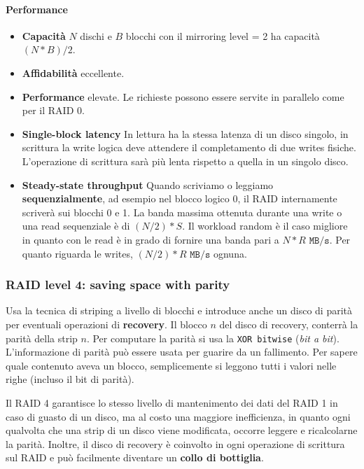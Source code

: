 \documentclass[12pt, letterpaper]{article}
\begin{document}
				\paragraph{Performance}
					\begin{itemize}
						\item \textbf{Capacità} $N$ dischi e $B$ blocchi con il mirroring level = 2 ha capacità $(N*B)/2$.
						\item \textbf{Affidabilità} eccellente.
						\item \textbf{Performance} elevate. Le richieste possono essere servite in parallelo come per il RAID 0.
						\item \textbf{Single-block latency} In lettura ha la stessa latenza di un disco singolo, in scrittura la write logica deve attendere il completamento di due writes fisiche. L'operazione di scrittura sarà più lenta rispetto a quella in un singolo disco.
						\item \textbf{Steady-state throughput} Quando scriviamo o leggiamo \textbf{sequenzialmente}, ad esempio nel blocco logico 0, il RAID internamente scriverà sui blocchi 0 e 1. La banda massima ottenuta durante una write o una read sequenziale è di $(N/2)*S$.  Il workload random è il caso migliore in quanto con le read è in grado di fornire una banda pari a $N*R \texttt{ MB/s}$. Per quanto riguarda le writes, $(N/2)*R \texttt{ MB/s}$ ognuna.
					\end{itemize}
					
			\subsubsection{RAID level 4: saving space with parity}
				Usa la tecnica di striping a livello di blocchi e introduce anche un disco di parità per eventuali operazioni di \textbf{recovery}. Il blocco $n$ del disco di recovery, conterrà la parità della strip $n$. Per computare la parità si usa la \texttt{XOR bitwise} (\textit{bit a bit}). L'informazione di parità può essere usata per guarire da un fallimento. Per sapere quale contenuto aveva un blocco, semplicemente si leggono tutti i valori nelle righe (incluso il bit di parità).
				
				Il RAID 4 garantisce lo stesso livello di mantenimento dei dati del RAID 1 in caso di guasto di un disco, ma al costo una maggiore inefficienza, in quanto ogni qualvolta che una strip di un disco viene modificata, occorre leggere e ricalcolarne la parità. Inoltre, il disco di recovery è coinvolto in ogni operazione di scrittura sul RAID e può facilmente diventare un \textbf{collo di bottiglia}.
				
\end{document}
